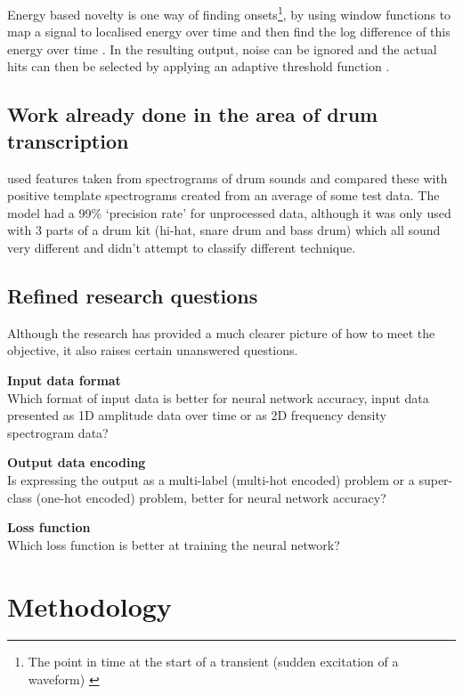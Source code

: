 \documentclass[12pt]{article}
\begin{document}
	Energy based novelty is one way of finding onsets\footnote{The point in time at the start of a transient (sudden excitation of a waveform) \parencite{Bello2005, Muller}}, by using window functions to map a signal to localised energy over time and then find the log difference of this energy over time \parencite[p306-307]{Muller}. In the resulting output, noise can be ignored and the actual hits can then be selected by applying an adaptive threshold function \parencite{Bello2005}.\medskip
	
	\subsection{Work already done in the area of drum transcription}
	\label{sec:previous_work}
	\textcite{Paulus2005} used features taken from spectrograms of drum sounds and compared these with positive template spectrograms created from an average of some test data. The model had a 99\% `precision rate' for unprocessed data, although it was only used with 3 parts of a drum kit (hi-hat, snare drum and bass drum) which all sound very different and didn't attempt to classify different  technique.\medskip
	
	\subsection{Refined research questions}
	\label{sec:questions}
	Although the research has provided a much clearer picture of how to meet the objective, it also raises certain unanswered questions.\medskip
	
	\textbf{Input data format}\\
	Which format of input data is better for neural network accuracy, input data presented as 1D amplitude data over time or as 2D frequency density spectrogram data?\smallskip
	
	\textbf{Output data encoding}\\
	Is expressing the output as a multi-label (multi-hot encoded) problem or a super-class (one-hot encoded) problem, better for neural network accuracy?\smallskip  
	
	\textbf{Loss function}\\
	Which loss function is better at training the neural network? \smallskip
	
	\newpage
	\section{Methodology}
	\setcounter{subsection}{-1}
\end{document}

